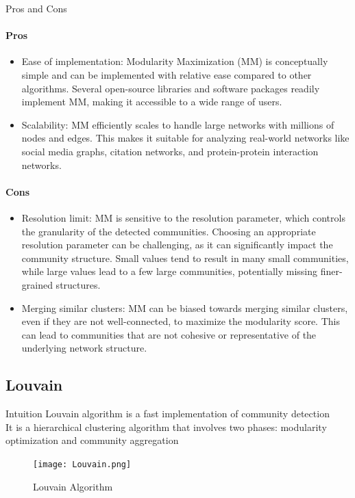 \begin{frame}[fragile]{Pros and Cons}
    \paragraph{Pros}
    \begin{itemize}
        \item Ease of implementation: Modularity Maximization (MM) is conceptually simple and can be implemented with relative ease compared to other algorithms. Several open-source libraries and software packages readily implement MM, making it accessible to a wide range of users.
        \item Scalability: MM efficiently scales to handle large networks with millions of nodes and edges. This makes it suitable for analyzing real-world networks like social media graphs, citation networks, and protein-protein interaction networks.
    \end{itemize}
    \paragraph{Cons}
    \begin{itemize}
        \item Resolution limit: MM is sensitive to the resolution parameter, which controls the granularity of the detected communities. Choosing an appropriate resolution parameter can be challenging, as it can significantly impact the community structure. Small values tend to result in many small communities, while large values lead to a few large communities, potentially missing finer-grained structures.
        \item Merging similar clusters: MM can be biased towards merging similar clusters, even if they are not well-connected, to maximize the modularity score. This can lead to communities that are not cohesive or representative of the underlying network structure.
    \end{itemize}
\end{frame}
\subsection{Louvain}
\begin{frame}[fragile]{Intuition}
Louvain algorithm is a fast implementation of community detection\\
It is a hierarchical clustering algorithm that involves two phases: modularity optimization and community aggregation
\begin{center}
    \begin{figure}[!htp]
    \centering
    \texttt{[image: Louvain.png]}
    \caption{Louvain Algorithm}
    \label{subsection}
\end{figure}
\end{center}
\end{frame}

